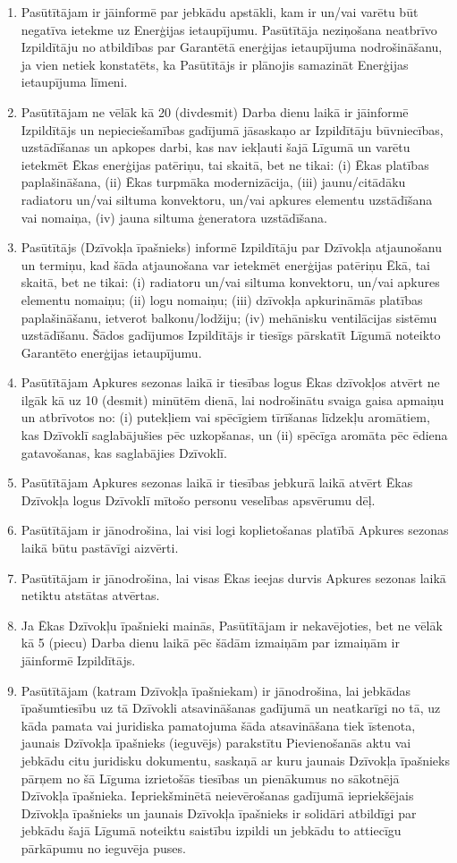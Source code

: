 \begin{multicols}{2}
\begin{enumerate}
	\item Pasūtītājam ir jāinformē par jebkādu apstākli, kam ir un/vai varētu būt negatīva ietekme uz Enerģijas ietaupījumu. Pasūtītāja neziņošana neatbrīvo Izpildītāju no atbildības par Garantētā enerģijas ietaupījuma nodrošināšanu, ja vien netiek konstatēts, ka Pasūtītājs ir plānojis samazināt Enerģijas ietaupījuma līmeni.
	\item Pasūtītājam ne vēlāk kā 20 (divdesmit) Darba dienu laikā ir jāinformē Izpildītājs un nepieciešamības gadījumā jāsaskaņo ar Izpildītāju būvniecības, uzstādīšanas un apkopes darbi, kas nav iekļauti šajā Līgumā un varētu ietekmēt Ēkas enerģijas patēriņu, tai skaitā, bet ne tikai: (i) Ēkas platības paplašināšana, (ii) Ēkas turpmāka modernizācija, (iii) jaunu/citādāku radiatoru un/vai siltuma konvektoru, un/vai apkures elementu uzstādīšana vai nomaiņa, (iv) jauna siltuma ģeneratora uzstādīšana.
	\item Pasūtītājs (Dzīvokļa īpašnieks) informē Izpildītāju par Dzīvokļa atjaunošanu un termiņu, kad šāda atjaunošana var ietekmēt enerģijas patēriņu Ēkā, tai skaitā, bet ne tikai: (i) radiatoru un/vai siltuma konvektoru, un/vai apkures elementu nomaiņu; (ii) logu nomaiņu; (iii) dzīvokļa apkurināmās platības paplašināšanu, ietverot balkonu/lodžiju; (iv) mehānisku ventilācijas sistēmu uzstādīšanu. Šādos gadījumos Izpildītājs ir tiesīgs pārskatīt Līgumā noteikto Garantēto enerģijas ietaupījumu.
	\item Pasūtītājam Apkures sezonas laikā ir tiesības logus Ēkas dzīvokļos atvērt ne ilgāk kā uz 10 (desmit) minūtēm dienā, lai nodrošinātu svaiga gaisa apmaiņu un atbrīvotos no: (i) putekļiem vai spēcīgiem tīrīšanas līdzekļu aromātiem, kas Dzīvoklī saglabājušies pēc uzkopšanas, un (ii) spēcīga aromāta pēc ēdiena gatavošanas, kas saglabājies Dzīvoklī.
	\item Pasūtītājam Apkures sezonas laikā ir tiesības jebkurā laikā atvērt Ēkas Dzīvokļa logus Dzīvoklī mītošo personu veselības apsvērumu dēļ.
	\item Pasūtītājam ir jānodrošina, lai visi logi koplietošanas platībā Apkures sezonas laikā būtu pastāvīgi aizvērti.
	\item Pasūtītājam ir jānodrošina, lai visas Ēkas ieejas durvis Apkures sezonas laikā netiktu atstātas atvērtas.
	\item Ja Ēkas Dzīvokļu īpašnieki mainās, Pasūtītājam ir nekavējoties, bet ne vēlāk kā 5 (piecu) Darba dienu laikā pēc šādām izmaiņām par izmaiņām ir jāinformē Izpildītājs.
	\item Pasūtītājam (katram Dzīvokļa īpašniekam) ir jānodrošina, lai jebkādas īpašumtiesību uz tā Dzīvokli atsavināšanas gadījumā un neatkarīgi no tā, uz kāda pamata vai juridiska pamatojuma šāda atsavināšana tiek īstenota, jaunais Dzīvokļa īpašnieks (ieguvējs) parakstītu Pievienošanās aktu vai jebkādu citu juridisku dokumentu, saskaņā ar kuru jaunais Dzīvokļa īpašnieks pārņem no šā Līguma izrietošās tiesības un pienākumus no sākotnējā Dzīvokļa īpašnieka. Iepriekšminētā neievērošanas gadījumā iepriekšējais Dzīvokļa īpašnieks un jaunais Dzīvokļa īpašnieks ir solidāri atbildīgi par jebkādu šajā Līgumā noteiktu saistību izpildi un jebkādu to attiecīgu pārkāpumu no ieguvēja puses.

\end{enumerate}
\end{multicols}
